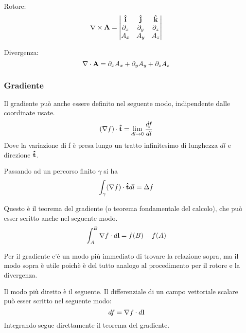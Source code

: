 Rotore: 
\begin{equation}
    \nabla \times \mathbf A = 
    \begin{vmatrix}
        \mathbf{\hat i }     & \mathbf{\hat j }       & \mathbf{\hat k }       \\
        \partial_x  & \partial_y    & \partial_z    \\
        A_x         & A_y           & A_z
    \end{vmatrix}
\end{equation}

Divergenza: 
\begin{equation}
    \nabla \cdot \mathbf A = \partial_x A_x + \partial_y A_y + \partial_z A_z
\end{equation}


\subsubsection{Gradiente} %
\label{ssub:gradiente}


Il gradiente può anche essere definito nel seguente modo, indipendente dalle coordinate usate.
\begin{equation} \label{eq:grad_def}
    ( \nabla f ) \cdot \mathbf{\hat t } = \lim_{ dl \to 0 }  \frac{ df }{ dl } 
\end{equation}
Dove la variazione di f è presa lungo un tratto infinitesimo di lunghezza $dl$ e direzione $\mathbf{\hat t }$.

Passando ad un percorso finito $\gamma$ si ha 
\begin{equation*}
    \int_\gamma ( \nabla f ) \cdot \mathbf{\hat t } dl = \Delta f
\end{equation*}

Questo è il teorema del gradiente (o teorema fondamentale del calcolo), che può esser scritto anche nel seguente modo.
\begin{equation}
    \int_A^B \nabla f \cdot d \mathbf l = f(B) - f(A)
\end{equation}

Per il gradiente c'è un modo più immediato di trovare la relazione sopra, ma il modo sopra è utile poichè è del tutto analogo al procedimento per il rotore e la divergenza.

Il modo più diretto è il seguente. Il differenziale di un campo vettoriale scalare può esser scritto nel seguente modo:
\begin{equation}
    df = \nabla f \cdot d \mathbf l
\end{equation}
Integrando segue direttamente il teorema del gradiente.

